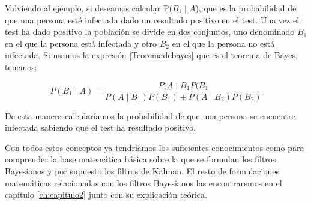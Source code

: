 Volviendo al ejemplo, si deseamos calcular P($B_{1} \mid A$), que es la probabilidad de que una persona esté infectada dado un resultado positivo en el test. Una vez el test ha dado positivo la población se divide en dos conjuntos, uno denominado $B_{1}$ en el que la persona está infectada y otro $B_{2}$ en el que la persona no está infectada. Si usamos la expresión \ref{Teoremadebayes} que es el teorema de Bayes, tenemos:

\begin{equation}\label{Pcondicionaejemplo4}
P(B_{1}\mid A) = \frac{P(A \mid B_{1}P(B_{1}}{P(A \mid B_{1})P(B_{1}) + P(A \mid B_{2})P(B_{2})}
\end{equation}

De esta manera calcularíamos la probabilidad de que una persona se encuentre infectada sabiendo que el test ha resultado positivo.

Con todos estos conceptos ya tendríamos los suficientes conocimientos como para comprender la base matemática básica sobre la que se formulan los filtros Bayesianos y por supuesto los filtros de Kalman.
El resto de formulaciones matemáticas relacionadas con los filtros Bayesianos las encontraremos en el capítulo \ref{ch:capitulo2} junto con su explicación teórica.
